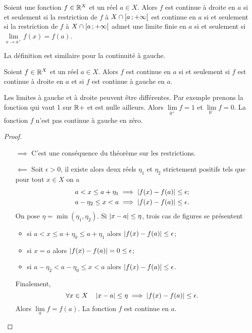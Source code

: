 \begin{defdef}
  Soient une fonction $f \in \mathbb{R}^X$ et un réel $a \in X$. Alors $f$ est continue à droite en $a$ si et seulement si la restriction de $f$ à $X\cap\left[ a \, ;  +\infty \right[$ est continue en $a$ si et seulement si la restriction de $f$ à $X\cap \left[ a \, ;  +\infty \right[$ admet une limite finie en $a$ si et seulement si $\lim\limits_{x \to a^{+}}f(x) = f(a)$.
\end{defdef}
La définition est similaire pour la continuité à gauche.
\begin{prop}
  Soient $f \in \mathbb{R}^X$ et un réel $a \in X$. Alors $f$ est continue en $a$ si et seulement si $f$ est continue à droite en $a$ et si $f$ est continue à gauche en $a$.
\end{prop}
Les limites à gauche et à droite peuvent être différentes. Par exemple prenons la fonction qui vaut 1 sur $\mathbb{R}+$ et est nulle ailleurs. Alors $\lim\limits_{0^{+}} f=1$ et $\lim\limits_{0^{-}} f=0$. La fonction $f$ n'est pas continue à gauche en zéro.
\begin{proof}
  \begin{itemize}
  \item[$\implies$] C'est une conséquence du théorème sur les restrictions.
  \item[$\impliedby$] Soit $\epsilon > 0$, il existe alors deux réels $\eta_1$ et $\eta_2$ strictement positifs tels que pour tout $x \in X$ on a
    \begin{align}
      a < x \leq a +\eta_1 \implies \left\lvert f(x)-f(a)\right\rvert \leq \epsilon;\\
      a-\eta_2 \leq x < a \implies \left\lvert f(x)-f(a)\right\rvert \leq \epsilon.
    \end{align}
    On pose $\eta=\min(\eta_1,\eta_2)$. Si $\left\lvert x-a\right\rvert \leq \eta$, trois cas de figures se présentent
    \begin{itemize}
    \item si $a < x \leq a+\eta_0 \leq a+\eta_1$ alors $\left\lvert f(x)-f(a)\right\rvert \leq \epsilon$;
    \item si $x=a$ alors $\left\lvert f(x)-f(a)\right\rvert = 0 \leq \epsilon$;
    \item si $a-\eta_2 < a-\eta_0 \leq x < a$ alors $\left\lvert f(x)-f(a)\right\rvert \leq \epsilon$.
    \end{itemize}
    Finalement,
    \begin{equation}
      \forall x \in X \quad \left\lvert x-a\right\rvert \leq \eta \implies \left\lvert f(x)-f(a)\right\rvert \leq \epsilon.
    \end{equation}
    Alors $\lim\limits_{a} f=f(a)$. La fonction $f$ est continue en $a$.
  \end{itemize}
\end{proof}

